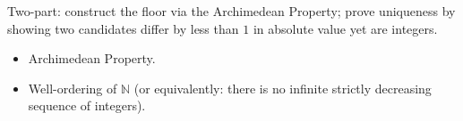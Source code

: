\begin{remark*}
Two-part: construct the floor via the Archimedean Property; prove uniqueness
by showing two candidates differ by less than $1$ in absolute value yet are integers.
\end{remark*}

\begin{remark*}[Dependencies]
\begin{itemize}
  \item Archimedean Property.
  \item Well-ordering of $\mathbb{N}$ (or equivalently: there is no infinite
        strictly decreasing sequence of integers).
\end{itemize}
\end{remark*}
